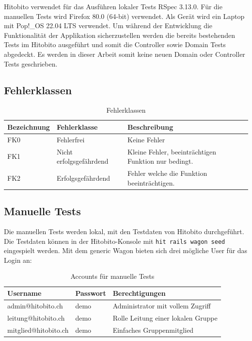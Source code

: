 Hitobito verwendet für das Ausführen lokaler Tests RSpec 3.13.0. Für die manuellen Tests wird Firefox 80.0 (64-bit) verwendet. Als Gerät wird ein Laptop mit Pop!\_OS 22.04 LTS verwendet.
Um während der Entwicklung die Funktionalität der Applikation sicherzustellen werden die bereits bestehenden Tests im Hitobito ausgeführt und somit die Controller sowie Domain Tests abgedeckt.
Es werden in dieser Arbeit somit keine neuen Domain oder Controller Tests geschrieben.

\newpage

\subsection{Fehlerklassen}

\begin{table}[h!]
   \begin{tabular}{|L{0.2\textwidth}|L{0.4\textwidth}|L{0.4\textwidth}|}
       \hline
        \color{white}\textbf{Bezeichnung} & \color{white}\textbf{Fehlerklasse} & \color{white}\textbf{Beschreibung} \\[12pt]
       \hline
       FK0 & Fehlerfrei & Keine Fehler \\
       \hline
       FK1 & Nicht erfolgsgefährdend & Kleine Fehler, beeinträchtigen Funktion nur bedingt. \\
       \hline
       FK2 & Erfolgsgefährdend & Fehler welche die Funktion beeinträchtigen. \\
       \hline
     \end{tabular}
     \caption{Fehlerklassen}
\end{table}

\subsection{Manuelle Tests}
Die manuellen Tests werden lokal, mit den Testdaten von Hitobito durchgeführt. Die Testdaten können in der Hitobito-Konsole
mit \texttt{hit rails wagon seed} eingespielt werden. Mit dem generic Wagon bieten sich drei mögliche User für das Login an:

\begin{table}[h!]
   \begin{tabular}{|L{0.4\textwidth}|L{0.2\textwidth}|L{0.4\textwidth}|}
       \hline
        \color{white}\textbf{Username} & \color{white}\textbf{Passwort} & \color{white}\textbf{Berechtigungen}\\[12pt]
       \hline
        admin@hitobito.ch & demo & Administrator mit vollem Zugriff \\
       \hline
       leitung@hitobito.ch & demo &  Rolle Leitung einer lokalen Gruppe\\
       \hline
       mitglied@hitobito.ch & demo & Einfaches Gruppenmitglied \\
       \hline
     \end{tabular}
     \caption{Accounts für manuelle Tests}
\end{table}


